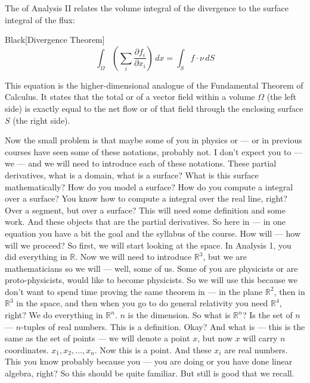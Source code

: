 \begin{math-stroke}
The  of Analysis II relates the volume integral of the divergence to the surface integral of the flux:
\begin{color-box}{Black}[Divergence Theorem]
\[ \int_{\Omega} \left( \sum_{i} \frac{\partial f_i}{\partial x_i} \right) \, dx = \int_{S} f \cdot \nu \, dS \]
\end{color-box}

\begin{explanation-of-steps}
This equation is the higher-dimensional analogue of the Fundamental Theorem of Calculus. It states that the total  or  of a vector field within a volume $\Omega$ (the left side) is exactly equal to the net flow or  of that field through the enclosing surface $S$ (the right side).
\end{explanation-of-steps}
\end{math-stroke}

\begin{spoken-clean}[00:15:15 - 00:17:38]
Now the small problem is that maybe some of you in physics or — or in previous courses have seen some of these notations, probably not. I don't expect you to — we — and we will need to introduce each of these notations. These partial derivatives, what is a domain, what is a surface? What is this surface mathematically? How do you model a surface? How do you compute a integral over a surface? You know how to compute a integral over the real line, right? Over a segment, but over a surface? This will need some definition and some work. And these objects that are the partial derivatives. So here in — in one equation you have a bit the goal and the syllabus of the course. How will — how will we proceed? So first, we will start looking at the space. In Analysis 1, you did everything in $\mathbb{R}$. Now we will need to introduce $\mathbb{R}^3$, but we are mathematicians so we will — well, some of us. Some of you are physicists or are proto-physicists, would like to become physicists. So we will use this because we don't want to spend time proving the same theorem in — in the plane $\mathbb{R}^2$, then in $\mathbb{R}^3$ in the space, and then when you go to do general relativity you need $\mathbb{R}^4$, right? We do everything in $\mathbb{R}^n$. $n$ is the dimension. So what is $\mathbb{R}^n$? Is the set of $n$ — $n$-tuples of real numbers. This is a definition. Okay? And what is — this is the same as the set of points — we will denote a point $x$, but now $x$ will carry $n$ coordinates. $x_1, x_2, \dots, x_n$. Now this is a point. And these $x_i$ are real numbers. This you know probably because you — you are doing or you have done linear algebra, right? So this should be quite familiar. But still is good that we recall.
\end{spoken-clean}


